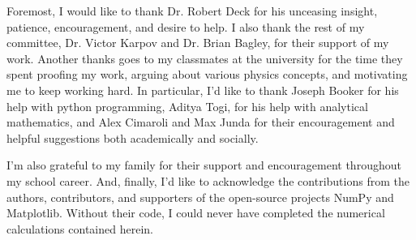 \documentclass[12pt]{uthesis-v12}
\begin{document}

\begin{acknowledgments}
\noindent
Foremost, I would like to thank Dr. Robert Deck for his unceasing insight, patience, encouragement, and desire to help. I also thank the rest of my committee, Dr. Victor Karpov and Dr. Brian Bagley, for their support of my work. Another thanks goes to my classmates at the university for the time they spent proofing my work, arguing about various physics concepts, and motivating me to keep working hard. In particular, I'd like to thank Joseph Booker for his help with python programming, Aditya Togi, for his help with analytical mathematics, and Alex Cimaroli and Max Junda for their encouragement and helpful suggestions both academically and socially.

I'm also grateful to my family for their support and encouragement throughout my school career. And, finally, I'd like to acknowledge the contributions from the authors, contributors, and supporters of the open-source projects NumPy and Matplotlib. Without their code, I could never have completed the numerical calculations contained herein.
\end{acknowledgments}


\tableofcontents  %
\listoffigures    %




\begin{listofabbreviations} %
\end{listofabbreviations}
\end{document}
